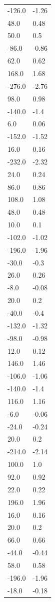 \begin{longtable}{ll}
-126.0 & -1.26 \\
48.0 & 0.48 \\
50.0 & 0.5 \\
-86.0 & -0.86 \\
62.0 & 0.62 \\
168.0 & 1.68 \\
-276.0 & -2.76 \\
98.0 & 0.98 \\
-140.0 & -1.4 \\
6.0 & 0.06 \\
-152.0 & -1.52 \\
16.0 & 0.16 \\
-232.0 & -2.32 \\
24.0 & 0.24 \\
86.0 & 0.86 \\
108.0 & 1.08 \\
48.0 & 0.48 \\
10.0 & 0.1 \\
-102.0 & -1.02 \\
-196.0 & -1.96 \\
-30.0 & -0.3 \\
26.0 & 0.26 \\
-8.0 & -0.08 \\
20.0 & 0.2 \\
-40.0 & -0.4 \\
-132.0 & -1.32 \\
-98.0 & -0.98 \\
12.0 & 0.12 \\
146.0 & 1.46 \\
-106.0 & -1.06 \\
-140.0 & -1.4 \\
116.0 & 1.16 \\
-6.0 & -0.06 \\
-24.0 & -0.24 \\
20.0 & 0.2 \\
-214.0 & -2.14 \\
100.0 & 1.0 \\
92.0 & 0.92 \\
22.0 & 0.22 \\
196.0 & 1.96 \\
16.0 & 0.16 \\
20.0 & 0.2 \\
66.0 & 0.66 \\
-44.0 & -0.44 \\
58.0 & 0.58 \\
-196.0 & -1.96 \\
-18.0 & -0.18 \\

\end{longtable}
